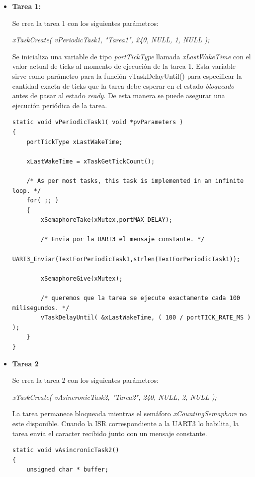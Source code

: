 \documentclass[a4paper,12pt]{article}
\begin{document}
\begin{itemize}

\item {\textbf{Tarea 1:}}

Se crea la tarea 1 con los siguientes parámetros:

\begin{center}
\textit{xTaskCreate( vPeriodicTask1, "Tarea1", 240, NULL, 1, NULL );}
\end{center}

Se inicializa una variable de tipo \textit{portTickType} llamada \textit{xLastWakeTime} con el valor actual de ticks al momento de ejecución de la tarea 1.  Esta variable sirve como parámetro para la función vTaskDelayUntil() para especificar la cantidad exacta de ticks que la tarea debe esperar en el estado \textit{bloqueado} antes de pasar al estado \textit{ready}.  De esta manera se puede asegurar una ejecución periódica de la tarea.

\begin{verbatim}
static void vPeriodicTask1( void *pvParameters )
{
	portTickType xLastWakeTime;
	
	xLastWakeTime = xTaskGetTickCount();

	/* As per most tasks, this task is implemented in an infinite loop. */
	for( ;; )
	{
		xSemaphoreTake(xMutex,portMAX_DELAY);

		/* Envia por la UART3 el mensaje constante. */
		UART3_Enviar(TextForPeriodicTask1,strlen(TextForPeriodicTask1));

		xSemaphoreGive(xMutex);
		
		/* queremos que la tarea se ejecute exactamente cada 100 milisegundos. */
		vTaskDelayUntil( &xLastWakeTime, ( 100 / portTICK_RATE_MS ) );
	}
}
\end{verbatim} 

\item {\textbf{Tarea 2}}

Se crea la tarea 2 con los siguientes parámetros:

\begin{center}
\textit{xTaskCreate( vAsincronicTask2, "Tarea2", 240, NULL, 2, NULL );}
\end{center}

La tarea permanece bloqueada mientras el semáforo {\textit{xCountingSemaphore}} no este disponible. Cuando la ISR correspondiente a la UART3 lo habilita, la tarea envia el caracter recibido junto con un mensaje constante.

\begin{verbatim}
static void vAsincronicTask2()
{
	unsigned char * buffer;


\end{verbatim}
\end{itemize}
\end{document}
